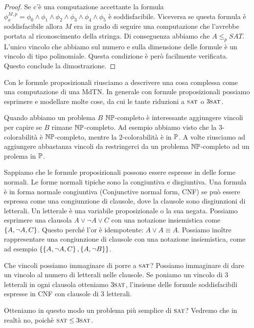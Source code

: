 \begin{proof}
    Se c'è una computazione accettante la formula $\phi_{x}^{M,p} = \phi_{0} \land \phi_{1} \land
    \phi_{2} \land \phi_{3} \land \phi_{4} \land \phi_{5}$ è soddisfacibile. Viceversa se questa
    formula è soddisfacibile allora $M$ era in grado di seguire una computazione che l'avrebbe
    portata al riconoscimento della stringa. Di conseguenza abbiamo che $A \leq_{p} SAT$. L'unico
    vincolo che abbiamo sul numero e sulla dimensione delle formule è un vincolo di tipo
    polinomiale. Questa condizione è però facilmente verificata. Questo conclude la dimostrazione.

\end{proof}

Con le formule proposizionali riusciamo a descrivere una cosa complessa come una computazione di una
MdTN. In generale con formule proposizionali possiamo esprimere e modellare molte cose, da cui le
tante riduzioni a $\textsc{sat}$ o $3\textsc{sat}$.

Quando abbiamo un problema $B$ $\mathbb{NP}$-completo è interessante aggiungere vincoli per capire se
$B$ rimane $\mathbb{NP}$-completo. Ad esempio abbiamo visto che la 3-colorabilità è
$\mathbb{NP}$-completo, mentre la 2-colorabilità è in $\mathbb{P}$. A volte riusciamo ad aggiungere
abbastanza vincoli da restringerci da un problema $\mathbb{NP}$-completo ad un prolema in $\mathbb{P}$.

Sappiamo che le formule proposizionali possono essere espresse in delle forme normali. Le forme
normali tipiche sono la congiuntiva e disgiuntiva.  Una formula è in forma normale congiuntiva
(Conjunctive normal form, CNF) se può essere espressa come una congiunzione di clausole, dove la
clausole sono disgiunzioni di letterali. Un letterale è una variabile proposizionale o la sua
negata. Possiamo esprimere una clausola $A \lor \lnot A \lor C$ con una notazione insiemistica come
$\left\{A,\lnot A,C\right\}$. Questo perché l'or è idempotente: $A \lor A \equiv A$. Possiamo inoltre
rappresentare una congiunzione di clausole con una notazione insiemistica, come ad esempio
$\left\{\left\{A,\lnot A,C\right\},\left\{A,\lnot B\right\}\right\}$.

Che vincoli possiamo immaginare di porre a $\textsc{sat}$? Possiamo immaginare di dare un vincolo al numero
di letterali nelle clausole. Se poniamo un vincolo di 3 letterali in ogni clausola otteniamo
$3\textsc{sat}$, l'insieme delle formule soddisfacibili espresse in CNF con clausole di 3 letterali.

Otteniamo in questo modo un problema più semplice di $\textsc{sat}$? Vedremo che in realtà no, poichè
$\textsc{sat} \leq 3\textsc{sat}$.

